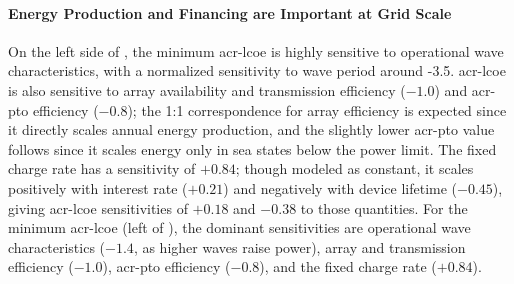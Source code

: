 \paragraph{Energy Production and Financing are Important at Grid Scale}
\ifdefined\DISSERTATION
    On the left side of , the minimum \gls{acr-lcoe} is highly sensitive to operational wave characteristics,
    with a normalized sensitivity to wave period around -3.5.
    \gls{acr-lcoe} is also sensitive to array availability and transmission efficiency ($-1.0$) and \gls{acr-pto} efficiency ($-0.8$);
    the 1:1 correspondence for array efficiency is expected since it directly scales annual energy production,
    and the slightly lower \gls{acr-pto} value follows since it scales energy only in sea states below the power limit.
    The fixed charge rate has a sensitivity of $+0.84$; though modeled as constant, it scales positively with interest rate ($+0.21$)
    and negatively with device lifetime ($-0.45$), giving \gls{acr-lcoe} sensitivities of $+0.18$ and $-0.38$ to those quantities.
\else
    For the minimum \gls{acr-lcoe} (left of ), the dominant sensitivities are
    operational wave characteristics ($-1.4$, as higher waves raise power),
    array and transmission efficiency ($-1.0$),
    \gls{acr-pto} efficiency ($-0.8$), and the 
    fixed charge rate ($+0.84$).
\fi

